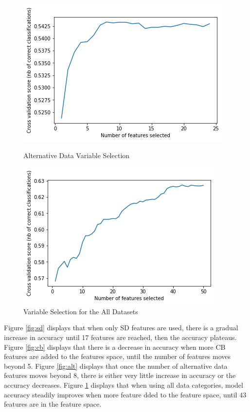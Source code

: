 \begin{figure}[!htb]
\centering
  \begin{minipage}{0.5\textwidth}
    \includegraphics[width=\textwidth]{images/alt_only.png}
    \caption{Alternative Data Variable Selection}
    \label{fig:alt}
  \end{minipage}%
  \begin{minipage}{0.5\textwidth}
    \includegraphics[width=\textwidth]{images/sd_cb_alt.png}
    \caption{Variable Selection for the All Datasets}
    \label{fig:all}
  \end{minipage}
\end{figure}

\vspace{10 pt}

Figure \ref{fig:sd} displays that when only SD features are used, there is a gradual increase in accuracy until 17 features are reached, then the accuracy plateaus. Figure \ref{fig:cb} displays that there is a decrease in accuracy when more CB features are added to the features space, until the number of features moves beyond 5. Figure \ref{fig:alt} displays that once the number of alternative data features moves beyond 8, there is either very little increase in accuracy or the accuracy decreases. Figure \ref{fig:all} displays that when using all data categories, model accuracy steadily improves when more feature dded to the feature space, until 43 features are in the feature space. \\

